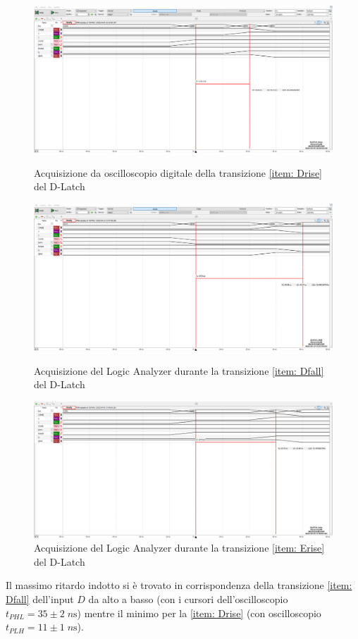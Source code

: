 \documentclass[10pt, a4paper, italian]{article}
\begin{document}
\begin{figure}[htbp]
    \centering
    \includegraphics[width=\textwidth]{dlatch_Drise}
    \caption{Acquisizione da oscilloscopio digitale della transizione
    \ref{item: Drise} del D-Latch \label{fig: Drise_osc}}
    \includegraphics[width=\textwidth]{dlatch_Dfall40}
    \caption{Acquisizione del Logic Analyzer durante la transizione
    \ref{item: Dfall} del D-Latch \label{fig: Dfall}}
    \includegraphics[width=\textwidth]{dlatch_Erise}
    \caption{Acquisizione del Logic Analyzer durante la transizione
    \ref{item: Erise} del D-Latch \label{fig: Erise}}
\end{figure}

Il massimo ritardo indotto si è trovato in corrispondenza della transizione
\ref{item: Dfall} dell'input $D$ da alto a basso (con i cursori
dell'oscilloscopio $t_{PHL} = 35 \pm 2 \; \si{n\s}$) mentre il minimo per la
\ref{item: Drise} (con oscilloscopio $t_{PLH} = 11 \pm 1 \; \si{n\s}$).
\end{document}
